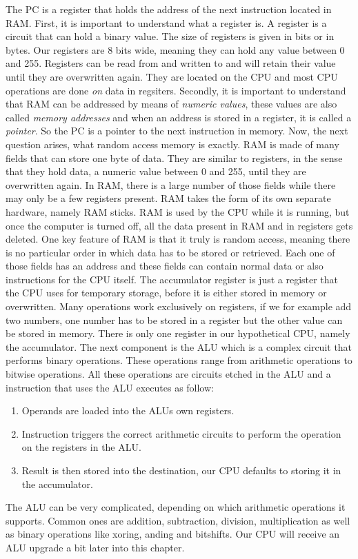 The PC is a register that holds the address of the next instruction located in RAM.
First, it is important to understand what a register is. A register is a circuit
that can hold a binary value. The size of registers is given in bits or in bytes. Our
registers are 8 bits wide, meaning they can hold any value between 0 and 255. 
Registers can be read from and written to and will retain their value until they are
overwritten again. They are located on the CPU and most CPU operations are done \textit{on}
data in regsiters. \newline
Secondly, it is important to understand that RAM can be addressed by means of \textit{numeric
values}, these values are also called \textit{memory addresses} and when an address is stored
in a register, it is called a \textit{pointer}. So the PC is a pointer to the next instruction
in memory. \newline
Now, the next question arises, what random access memory is exactly. RAM is made of many fields 
that can store one byte of data. They are similar to registers, in the sense that they hold data, a numeric
value between 0 and 255, until they are overwritten again. In RAM, there is a large number of
those fields while there may only be a few registers present. RAM takes the form of its
own separate hardware, namely RAM sticks. RAM is used by the CPU while it is running, but
once the computer is turned off, all the data present in RAM and in registers gets deleted.
One key feature of RAM is that it truly is random access, meaning there is no particular order
in which data has to be stored or retrieved. Each one of those fields has an address and
these fields can contain normal data or also instructions for the CPU itself.\newline
The accumulator register is just a register that the CPU uses for temporary storage, before
it is either stored in memory or overwritten. Many operations work exclusively on registers,
if we for example add two numbers, one number has to be stored in a register but the other
value can be stored in memory. There is only one register in our hypothetical CPU, namely
the accumulator.\newline
The next component is the ALU which is a complex circuit that performs binary operations.
These operations range from arithmetic operations to bitwise operations. All these
operations are circuits etched in the ALU and a instruction that uses
the ALU executes as follow:
\begin{enumerate}
\item Operands are loaded into the ALUs own registers.
\item Instruction triggers the correct arithmetic circuits to perform the operation on the registers in the ALU.
\item Result is then stored into the destination, our CPU defaults to storing it in the accumulator.
\end{enumerate}
The ALU can be very complicated, depending on which arithmetic operations it supports. Common
ones are addition, subtraction, division, multiplication as well as binary operations like
xoring, anding and bitshifts. Our CPU will receive an ALU upgrade a bit later into this chapter.



